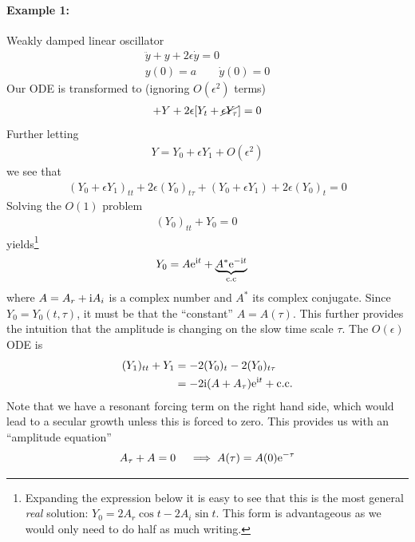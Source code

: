 \paragraph{Example 1:} Weakly damped linear oscillator
\begin{equation}\label{eqn:wk23-ex1-ode}
\begin{gathered}
\ddot{y} + y + 2 \epsilon \dot{y} = 0 \\
y(0) = a \qquad \dot{y}(0) = 0
\end{gathered}	
\end{equation}
Our ODE is transformed to (ignoring $O(\epsilon^2)$ terms)
\begin{align*}
	[Y_{tt} + 2\epsilon Y_{t\tau} + \cancel{\epsilon^2 Y_{\tau \tau }}] + Y + 2\epsilon[Y_t + \cancel{\epsilon Y_\tau} ] = 0
\end{align*}
Further letting
\begin{gather*}
	Y = Y_0 + \epsilon Y_1 + O(\epsilon^2)
\end{gather*}
we see that
\begin{align*}
	(Y_0 + \epsilon Y_1)_{tt} + 2\epsilon (Y_0)_{t\tau} + (Y_0 + \epsilon Y_1) + 2\epsilon (Y_0)_{t} = 0
\end{align*}
Solving the $O(1)$ problem
\begin{gather*}
	(Y_0)_{tt} + Y_0 = 0 \qquad 
\end{gather*}
yields\footnote{Expanding the expression below it is easy to see that this is the most general \emph{real} solution: $Y_0 = 2A_r \cos t - 2A_i \sin t$. This form is advantageous as we would only need to do half as much writing.}
\begin{align*}
	Y_0 &= A \mathrm{e}^{\mathrm{i} t} + \underbrace{A^\ast \mathrm{e}^{-\mathrm{i} t}}_\text{c.c}
\end{align*}
where $A=A_r + \mathrm{i} A_i$ is a complex number and $A^\ast$ its complex conjugate. Since $Y_0 = Y_0(t,\tau)$, it must be that the ``constant'' $A=A(\tau)$. This further provides the intuition that the amplitude is changing on the slow time scale $\tau$. The $O(\epsilon)$ ODE is
\begin{align*}
	(Y_1)_{tt} + Y_1 &= -2(Y_0)_t - 2(Y_0)_{t\tau} \\
	&= -2\mathrm{i} (A + A_\tau) \mathrm{e}^{\mathrm{i} t} + \text{c.c.}
\end{align*}
Note that we have a resonant forcing term on the right hand side, which would lead to a secular growth unless this is forced to zero. This provides us with an ``amplitude equation''
\begin{gather*}
	A_\tau + A = 0 \quad \implies A(\tau) = A(0)\mathrm{e}^{-\tau}
\end{gather*}
